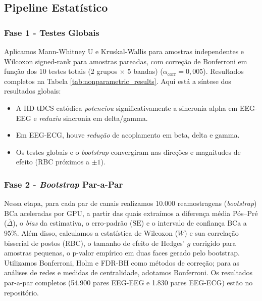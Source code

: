 \subsection{Pipeline Estatístico}

\subsubsection{Fase 1 - Testes Globais} 
Aplicamos Mann-Whitney U e Kruskal-Wallis para amostras independentes e Wilcoxon signed-rank para amostras pareadas, com correção de Bonferroni em função dos 10 testes totais (2 grupos × 5 bandas) ($\alpha_{\mathrm{corr}}=0{,}005$). Resultados completos na Tabela \ref{tab:nonparametric_results}. Aqui está a síntese dos resultados globais:
\begin{itemize}
    \item A HD-tDCS catódica \emph{potenciou} significativamente a sincronia alpha em EEG-EEG e \emph{reduziu} sincronia em delta/gamma.
    \item Em EEG-ECG, houve \emph{redução} de acoplamento em beta, delta e gamma.
    \item Os testes globais e o \textit{bootstrap} convergiram nas direções e magnitudes de efeito (RBC próximos a \(\pm1\)).
  \end{itemize}

\subsubsection{Fase 2 - \textit{Bootstrap} Par-a-Par} 
Nessa etapa, para cada par de canais realizamos 10.000 reamostragens (\textit{bootstrap}) BCa aceleradas por GPU, a partir das quais extraímos a diferença média Pós–Pré (\(\bar{\Delta}\)), o \textit{bias} da estimativa, o erro-padrão (\(\mathrm{SE}\)) e o intervalo de confiança BCa a 95\%. Além disso, calculamos a estatística de Wilcoxon (\(W\)) e sua correlação bisserial de postos (RBC), o tamanho de efeito de Hedges' \(g\) corrigido para amostras pequenas, o p-valor empírico em duas faces gerado pelo bootstrap. Utilizamos Bonferroni, Holm e FDR-BH como métodos de correção; para as análises de redes e medidas de centralidade, adotamos Bonferroni. Os resultados par-a-par completos (54.900 pares EEG-EEG e 1.830 pares EEG-ECG) estão no repositório.

